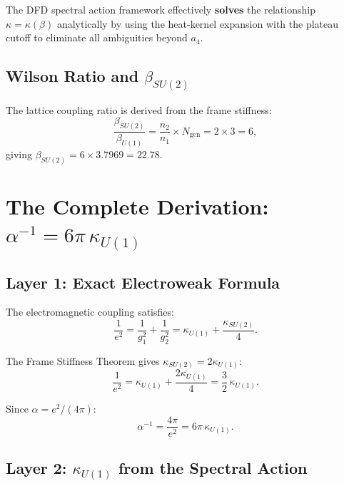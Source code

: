 \documentclass[12pt,a4paper]{article}
\begin{document}
The DFD spectral action framework effectively \textbf{solves} the
relationship $\kappa = \kappa(\beta)$ analytically by using the heat-kernel
expansion with the plateau cutoff to eliminate all ambiguities beyond $a_4$.

\subsection{Wilson Ratio and $\beta_{SU(2)}$}

The lattice coupling ratio is derived from the frame stiffness:
\begin{equation}\label{eq:wilson-ratio}
\frac{\beta_{SU(2)}}{\beta_{U(1)}} = \frac{n_2}{n_1} \times N_{\mathrm{gen}}
= 2 \times 3 = 6,
\end{equation}
giving $\beta_{SU(2)} = 6 \times 3.7969 = 22.78$.

\section{The Complete Derivation: $\alpha^{-1} = 6\pi\,\kappa_{U(1)}$}
\label{sec:complete}

\subsection{Layer 1: Exact Electroweak Formula}

The electromagnetic coupling satisfies:
\begin{equation}
\frac{1}{e^2} = \frac{1}{g_1^2} + \frac{1}{g_2^2}
= \kappa_{U(1)} + \frac{\kappa_{SU(2)}}{4}.
\end{equation}

The Frame Stiffness Theorem gives $\kappa_{SU(2)} = 2\kappa_{U(1)}$:
\begin{equation}
\frac{1}{e^2} = \kappa_{U(1)} + \frac{2\kappa_{U(1)}}{4}
= \frac{3}{2}\,\kappa_{U(1)}.
\end{equation}

Since $\alpha = e^2/(4\pi)$:
\begin{equation}\label{eq:master-formula}
\boxed{
\alpha^{-1} = \frac{4\pi}{e^2} = 6\pi\,\kappa_{U(1)}.
}
\end{equation}

\subsection{Layer 2: $\kappa_{U(1)}$ from the Spectral Action}
\end{document}
